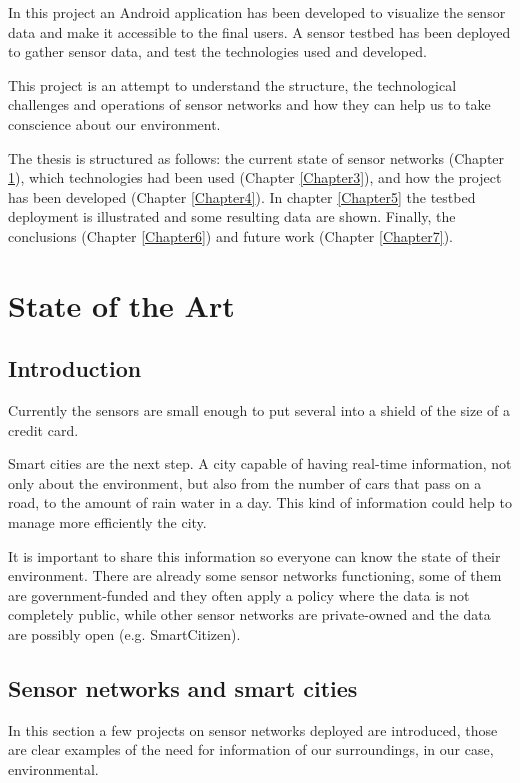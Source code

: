 \documentclass[12pt, a4paper,twoside]{tesi_upf}
\begin{document}
  In this project an Android application has been developed to visualize the sensor data and make it accessible to the final users.
  A sensor testbed has been deployed to gather sensor data, and test the technologies used and developed.
  
  This project is an attempt to understand the structure, the technological challenges and operations of sensor networks and how they can help us to take conscience about our environment.

  The thesis is structured as follows: the current state of sensor networks (Chapter \ref{Chapter2}), which technologies had been used (Chapter \ref{Chapter3}), and how the project has been developed (Chapter \ref{Chapter4}). 
  In chapter \ref{Chapter5} the testbed deployment is illustrated and some resulting data are shown.
  Finally, the conclusions (Chapter \ref{Chapter6}) and future work (Chapter \ref{Chapter7}).
  
\chapter{State of the Art}
\label{Chapter2}
  
  \section{Introduction}

    Currently the sensors are small enough to put several into a shield of the size of a credit card.
    
    Smart cities are the next step. A city capable of having real-time information, not only about the environment, but also from the number of cars that pass on a road, to the amount of rain water in a day. This kind of information could help to manage more efficiently the city.
    
    It is important to share this information so everyone can know the state of their environment. There are already some sensor networks functioning, some of them are government-funded and they often apply a policy where the data is not completely public, while other sensor networks are private-owned and the data are possibly open (e.g. SmartCitizen).

  \section{Sensor networks and smart cities}
    In this section a few projects on sensor networks deployed are introduced, those are clear examples of the need for information of our surroundings, in our case, environmental.
    
\end{document}
